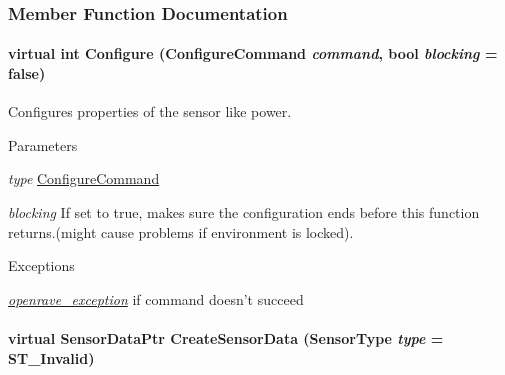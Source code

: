 \subsubsection{Member Function Documentation}
\hypertarget{classOpenRAVE_1_1SensorBase_ae02c7c4987dd11f5fb7657e18c7c8318}{
\paragraph[{Configure}]{\setlength{\rightskip}{0pt plus 5cm}virtual int Configure ({\bf ConfigureCommand} {\em command}, \/  bool {\em blocking} = {\ttfamily false})}\hfill}
\label{classOpenRAVE_1_1SensorBase_ae02c7c4987dd11f5fb7657e18c7c8318}


Configures properties of the sensor like power. 


\begin{DoxyParams}{Parameters}
\item[{\em type}]\hyperlink{classOpenRAVE_1_1SensorBase_a48dea54d66d3cd48fda033d19cad7dbc}{ConfigureCommand} \item[{\em blocking}]If set to true, makes sure the configuration ends before this function returns.(might cause problems if environment is locked). \end{DoxyParams}

\begin{DoxyExceptions}{Exceptions}
\item[{\em \hyperlink{classOpenRAVE_1_1openrave__exception}{openrave\_\-exception}}]if command doesn't succeed \end{DoxyExceptions}
\hypertarget{classOpenRAVE_1_1SensorBase_ae4531cd4b3e1de9708d9fc2cce769eff}{
\paragraph[{CreateSensorData}]{\setlength{\rightskip}{0pt plus 5cm}virtual SensorDataPtr CreateSensorData (SensorType {\em type} = {\ttfamily ST\_\-Invalid})}\hfill}
\label{classOpenRAVE_1_1SensorBase_ae4531cd4b3e1de9708d9fc2cce769eff}


